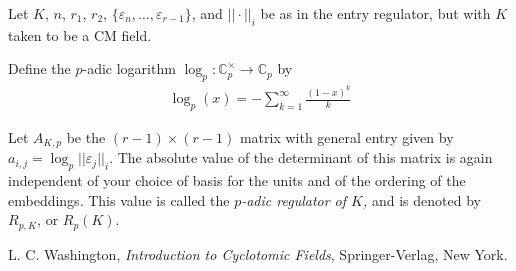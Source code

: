 \documentclass[12pt]{article}
\newcommand{\mb}{\mathbb}
\newcommand{\ra}{\rightarrow}
\newcommand{\<}{\langle}
\renewcommand{\>}{\rangle}
\begin{document}
Let $K$, $n$, $r_1$, $r_2$, $\{\varepsilon_n,\ldots,\varepsilon_{r-1}\}$, and $||\cdot||_i$ be as in the entry regulator, but with $K$ taken to be a CM field.

Define the $p$-adic logarithm $\log_p: \mb{C}_p^\times\ra \mb{C}_p$ by
\begin{align*}
\log_p(x)=-\sum_{k=1}^\infty \frac{(1-x)^k}{k}
\end{align*}

Let $A_{K,p}$ be the $(r-1)\times (r-1)$ matrix with general entry given by $a_{i,j}=\log_p ||\varepsilon_j||_i$.  The absolute value of the determinant of this matrix is again independent of your choice of basis for the units and of the ordering of the embeddings.  This value is called the \emph{$p$-adic regulator of $K$,} and is denoted by $R_{p,K}$, or $R_p(K)$.

\begin{thebibliography}{9}
 L. C. Washington, {\em Introduction to Cyclotomic Fields},
Springer-Verlag, New York.
\end{thebibliography}
\end{document}
